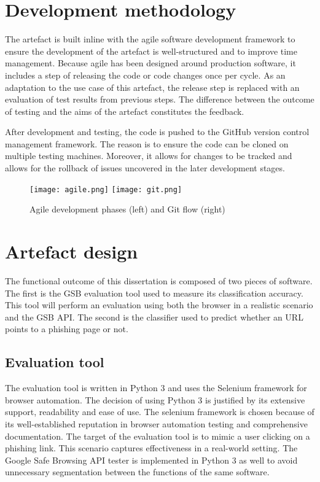 \section{Development methodology}
The artefact is built inline with the agile software development framework to ensure the development of the artefact is well-structured and to improve time management. Because agile has been designed around production software, it includes a step of releasing the code or code changes once per cycle. As an adaptation to the use case of this artefact, the release step is replaced with an evaluation of test results from previous steps. The difference between the outcome of testing and the aims of the artefact constitutes the feedback.

After development and testing, the code is pushed to the GitHub version control management framework. The reason is to ensure the code can be cloned on multiple testing machines. Moreover, it allows for changes to be tracked and allows for the rollback of issues uncovered in the later development stages.

\begin{figure}[b]
	\centering
	\texttt{[image: agile.png]}
	\texttt{[image: git.png]}
	\caption{Agile development phases (left) and Git flow (right)}
	\label{fig:INITIAL_ANALYSIS}
\end{figure}

\section{Artefact design}
The functional outcome of this dissertation is composed of two pieces of software. The first is the GSB evaluation tool used to measure its classification accuracy. This tool will perform an evaluation using both the browser in a realistic scenario and the GSB API. The second is the classifier used to predict whether an URL points to a phishing page or not.

\subsection{Evaluation tool}
The evaluation tool is written in Python 3 and uses the Selenium framework for browser automation. The decision of using Python 3 is justified by its extensive support, readability and ease of use. The selenium framework is chosen because of its well-established reputation in browser automation testing and comprehensive documentation.
The target of the evaluation tool is to mimic a user clicking on a phishing link. This scenario captures effectiveness in a real-world setting. The Google Safe Browsing API tester is implemented in Python 3 as well to avoid unnecessary segmentation between the functions of the same software.

